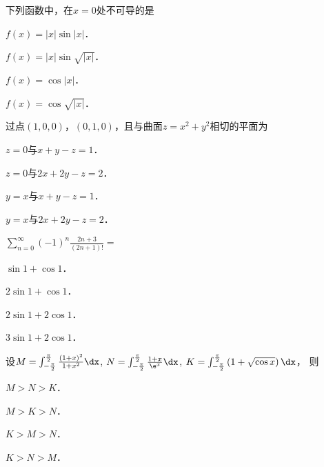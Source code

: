 \documentclass[plain,noanswer,medmath]{../../template/jnuexam}
\begin{document}




\begin{problem}
下列函数中，在$x = 0$处不可导的是\pickout{}
\begin{abcd}
\item $f(x) = |x|\sin |x|$．
\item $f(x) = |x|\sin \sqrt{|x|}$．
\item $f(x) = \cos |x|$．
\item $f(x) = \cos \sqrt{|x|}$．
\end{abcd}
\end{problem}


\begin{problem}
过点$(1,0,0)$，$(0,1,0)$，且与曲面$z = x^2 + y^2$相切的平面为\pickout{}
\begin{abcd}
\item $z = 0$与$x + y - z = 1$．
\item $z = 0$与$2x + 2y - z = 2$．
\item $y = x$与$x + y - z = 1$．
\item $y = x$与$2x + 2y - z = 2$．
\end{abcd}
\end{problem}


\begin{problem}
$\sum_{n = 0}^{\infty}(- 1)^n\frac{2n + 3}{\left(2n + 1 \right)!} =$\pickout{}
\begin{abcd}
\item $\sin 1 + \cos 1$．
\item $2\sin 1 + \cos 1$．
\item $2\sin 1 + 2\cos 1$．
\item $3\sin 1 + 2\cos 1$．
\end{abcd}
\end{problem}


\begin{problem}
设$M = \int_{-\frac{\pi}{2}}^{\frac{\pi}{2}} \frac{\left(1 + x \right)^2}{1 + x^2}\dx$,
  $N = \int_{-\frac{\pi}{2}}^{\frac{\pi}{2}} \frac{1 + x}{\e^x}\dx$,
  $K = \int_{-\frac{\pi}{2}}^{\frac{\pi}{2}} \left(1 + \sqrt{\cos x}\right)\dx$，
则\pickout{}
\begin{abcd}
\item $M > N > K$．
\item $M > K > N$．
\item $K > M > N$．
\item $K > N > M$．
\end{abcd}
\end{problem}
\end{document}
